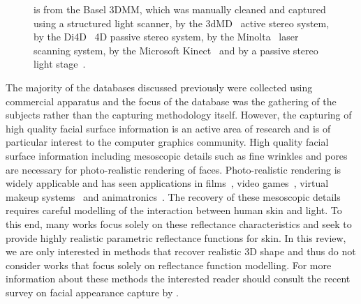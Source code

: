 \begin{figure}[ht]
{	          is from the Basel 3DMM,
	         which was manually cleaned and captured using a structured light
	         scanner,  by the
	         3dMD~\cite{3dmd} active stereo system,
	          by the
	         Di4D~\cite{di4d} 4D passive stereo system,
	          by the
	         Minolta~\cite{minolta} laser scanning system,
	          by the
	         Microsoft Kinect~\cite{zhang2012microsoft} and
	          by a passive stereo
	         light stage~\cite{debevec2000acquiring}.}
\label{fig:db_examples}
\end{figure}
The majority of the databases discussed previously were collected using
commercial apparatus and the focus of the database was the gathering of the
subjects rather than the capturing methodology itself. However, the capturing of
high quality facial surface information is an active area of research and is of
particular interest to the computer graphics community. High quality facial
surface information including mesoscopic details such as fine wrinkles and pores
are necessary for photo-realistic rendering of faces. Photo-realistic rendering
is widely applicable and has seen applications in
films~\cite{borshukov2005universal}, video games~\cite{vonderPahlen:2014kg},
virtual makeup systems~\cite{scherbaum2011computer} and
animatronics~\cite{jung2011believable}. The recovery of these mesoscopic details
requires careful modelling of the interaction between human skin and light. To
this end, many works focus solely on these reflectance characteristics and seek
to provide highly realistic parametric reflectance functions for skin. In this
review, we are only interested in methods that recover realistic 3D shape and
thus do not consider works that focus solely on reflectance function modelling.
For more information about these methods the interested reader should consult
the recent survey on facial appearance capture by \citet{Klehm:2015jb}.

